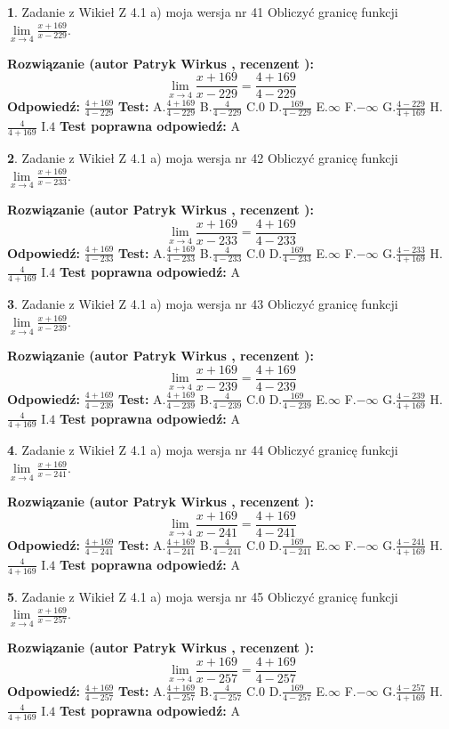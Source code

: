 \documentclass[12pt, a4paper]{article}
\theoremstyle{definition} %
\newtheorem{zad}{}
\newcommand{\zadStart}[1]{\begin{zad}#1\newline}
\newcommand{\zadStop}{\end{zad}}
\newcommand{\rozwStart}[2]{\noindent \textbf{Rozwiązanie (autor #1 , recenzent #2): }\newline}
\newcommand{\rozwStop}{\newline}
\newcommand{\odpStart}{\noindent \textbf{Odpowiedź:}\newline}
\newcommand{\odpStop}{\newline}
\newcommand{\testStart}{\noindent \textbf{Test:}\newline}
\newcommand{\testStop}{\newline}
\newcommand{\kluczStart}{\noindent \textbf{Test poprawna odpowiedź:}\newline}
\newcommand{\kluczStop}{\newline}
\begin{document}
\zadStart{Zadanie z Wikieł Z 4.1 a) moja wersja nr 41}
Obliczyć granicę funkcji $\lim\limits_{x\to4}\frac{x+169}{x-229}$.
\zadStop
\rozwStart{Patryk Wirkus}{}
$$\lim\limits_{x\to4}\frac{x+169}{x-229} = \frac{4+169}{4-229}$$
\rozwStop
\odpStart
$\frac{4+169}{4-229}$
\odpStop
\testStart
A.$\frac{4+169}{4-229}$
B.$\frac{4}{4-229}$
C.$0$
D.$\frac{169}{4-229}$
E.$\infty$
F.$-\infty$
G.$\frac{4-229}{4+169}$
H.$\frac{4}{4+169}$
I.$4$
\testStop
\kluczStart
A
\kluczStop



\zadStart{Zadanie z Wikieł Z 4.1 a) moja wersja nr 42}
Obliczyć granicę funkcji $\lim\limits_{x\to4}\frac{x+169}{x-233}$.
\zadStop
\rozwStart{Patryk Wirkus}{}
$$\lim\limits_{x\to4}\frac{x+169}{x-233} = \frac{4+169}{4-233}$$
\rozwStop
\odpStart
$\frac{4+169}{4-233}$
\odpStop
\testStart
A.$\frac{4+169}{4-233}$
B.$\frac{4}{4-233}$
C.$0$
D.$\frac{169}{4-233}$
E.$\infty$
F.$-\infty$
G.$\frac{4-233}{4+169}$
H.$\frac{4}{4+169}$
I.$4$
\testStop
\kluczStart
A
\kluczStop



\zadStart{Zadanie z Wikieł Z 4.1 a) moja wersja nr 43}
Obliczyć granicę funkcji $\lim\limits_{x\to4}\frac{x+169}{x-239}$.
\zadStop
\rozwStart{Patryk Wirkus}{}
$$\lim\limits_{x\to4}\frac{x+169}{x-239} = \frac{4+169}{4-239}$$
\rozwStop
\odpStart
$\frac{4+169}{4-239}$
\odpStop
\testStart
A.$\frac{4+169}{4-239}$
B.$\frac{4}{4-239}$
C.$0$
D.$\frac{169}{4-239}$
E.$\infty$
F.$-\infty$
G.$\frac{4-239}{4+169}$
H.$\frac{4}{4+169}$
I.$4$
\testStop
\kluczStart
A
\kluczStop



\zadStart{Zadanie z Wikieł Z 4.1 a) moja wersja nr 44}
Obliczyć granicę funkcji $\lim\limits_{x\to4}\frac{x+169}{x-241}$.
\zadStop
\rozwStart{Patryk Wirkus}{}
$$\lim\limits_{x\to4}\frac{x+169}{x-241} = \frac{4+169}{4-241}$$
\rozwStop
\odpStart
$\frac{4+169}{4-241}$
\odpStop
\testStart
A.$\frac{4+169}{4-241}$
B.$\frac{4}{4-241}$
C.$0$
D.$\frac{169}{4-241}$
E.$\infty$
F.$-\infty$
G.$\frac{4-241}{4+169}$
H.$\frac{4}{4+169}$
I.$4$
\testStop
\kluczStart
A
\kluczStop



\zadStart{Zadanie z Wikieł Z 4.1 a) moja wersja nr 45}
Obliczyć granicę funkcji $\lim\limits_{x\to4}\frac{x+169}{x-257}$.
\zadStop
\rozwStart{Patryk Wirkus}{}
$$\lim\limits_{x\to4}\frac{x+169}{x-257} = \frac{4+169}{4-257}$$
\rozwStop
\odpStart
$\frac{4+169}{4-257}$
\odpStop
\testStart
A.$\frac{4+169}{4-257}$
B.$\frac{4}{4-257}$
C.$0$
D.$\frac{169}{4-257}$
E.$\infty$
F.$-\infty$
G.$\frac{4-257}{4+169}$
H.$\frac{4}{4+169}$
I.$4$
\testStop
\kluczStart
A
\kluczStop
\end{document}
